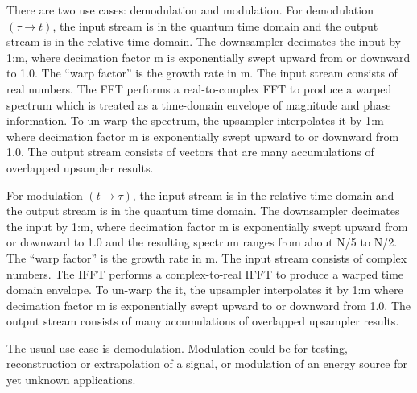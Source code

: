 There are two use cases: demodulation and modulation.
For demodulation $(\tau \rightarrow t)$, the input stream is in the quantum
time domain and the output stream is in the relative time domain.
The downsampler decimates the input by 1:m, where decimation factor m is
exponentially swept upward from or downward to 1.0.
The ``warp factor'' is the growth rate in m.
The input stream consists of real numbers.
The FFT performs a real-to-complex FFT to produce a warped spectrum which is
treated as a time-domain envelope of magnitude and phase information.
To un-warp the spectrum, the upsampler interpolates it by 1:m where decimation
factor m is exponentially swept upward to or downward from 1.0.
The output stream consists of vectors that are many accumulations of overlapped
upsampler results.

For modulation $(t \rightarrow \tau)$, the input stream is in the relative time
domain and the output stream is in the quantum time domain. The downsampler
decimates the input by 1:m, where decimation factor m is exponentially swept
upward from or downward to 1.0 and the resulting spectrum ranges from about
N/5 to N/2.
The ``warp factor'' is the growth rate in m.
The input stream consists of complex numbers.
The IFFT performs a complex-to-real IFFT to produce a warped time domain
envelope. To un-warp the it, the upsampler interpolates it by 1:m
where decimation factor m is exponentially swept upward to or downward from 1.0.
The output stream consists of many accumulations of overlapped upsampler results.

The usual use case is demodulation.
Modulation could be for testing, reconstruction or extrapolation of a signal,
or modulation of an energy source for yet unknown applications.


